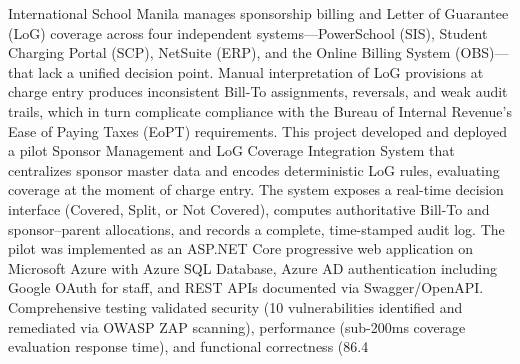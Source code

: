 
\begin{abstractwithpageno}	
International School Manila manages sponsorship billing and Letter of Guarantee (LoG) coverage across four independent systems—PowerSchool (SIS), Student Charging Portal (SCP), NetSuite (ERP), and the Online Billing System (OBS)—that lack a unified decision point. Manual interpretation of LoG provisions at charge entry produces inconsistent Bill-To assignments, reversals, and weak audit trails, which in turn complicate compliance with the Bureau of Internal Revenue’s Ease of Paying Taxes (EoPT) requirements. This project developed and deployed a pilot Sponsor Management and LoG Coverage Integration System that centralizes sponsor master data and encodes deterministic LoG rules, evaluating coverage at the moment of charge entry. The system exposes a real-time decision interface (Covered, Split, or Not Covered), computes authoritative Bill-To and sponsor–parent allocations, and records a complete, time-stamped audit log. The pilot was implemented as an ASP.NET Core progressive web application on Microsoft Azure with Azure SQL Database, Azure AD authentication including Google OAuth for staff, and REST APIs documented via Swagger/OpenAPI. Comprehensive testing validated security (10 vulnerabilities identified and remediated via OWASP ZAP scanning), performance (sub-200ms coverage evaluation response time), and functional correctness (86.4%

\end{abstractwithpageno}